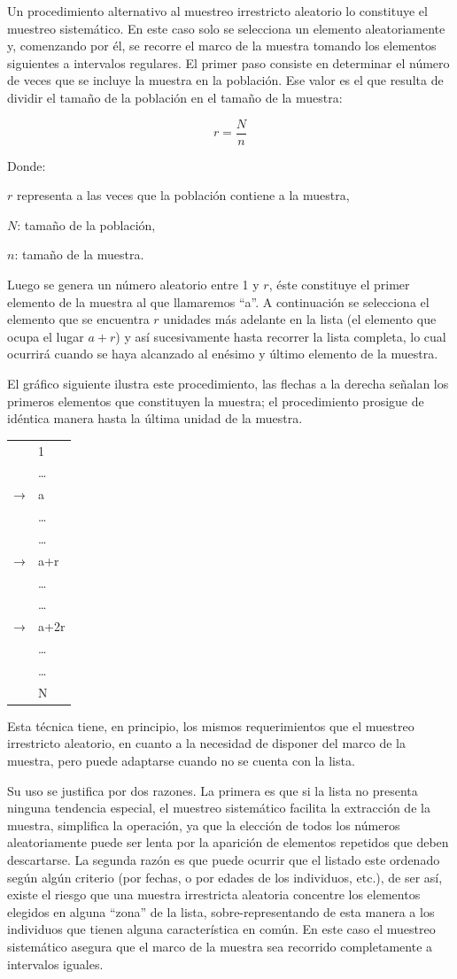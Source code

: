 \documentclass[]{book}
\begin{document}
Un procedimiento alternativo al muestreo irrestricto aleatorio lo constituye el muestreo sistemático. En este caso solo se selecciona un elemento aleatoriamente y, comenzando por él, se recorre el marco de la muestra tomando los elementos siguientes a intervalos regulares. El primer paso consiste en determinar el número de veces que se incluye la muestra en la población. Ese valor es el que resulta de dividir el tamaño de la población en el tamaño de la muestra:

\[r = \frac{N}{n}\]

Donde:

\(r\) representa a las veces que la población contiene a la muestra,

\(N\): tamaño de la población,

\(n\): tamaño de la muestra.

Luego se genera un número aleatorio entre 1 y \(r\), éste constituye el
primer elemento de la muestra al que llamaremos ``a''. A continuación se
selecciona el elemento que se encuentra \(r\) unidades más adelante en la lista (el elemento que ocupa el lugar \(a+r\)) y así sucesivamente hasta recorrer la lista completa, lo cual ocurrirá cuando se haya alcanzado al
enésimo y último elemento de la muestra.

El gráfico siguiente ilustra este procedimiento, las flechas a la
derecha señalan los primeros elementos que constituyen la muestra; el
procedimiento prosigue de idéntica manera hasta la última unidad de la
muestra.

\begin{longtable}[]{@{}ll@{}}
\toprule
\endhead
& 1\tabularnewline
& \ldots{}\tabularnewline
→ & a\tabularnewline
& \ldots{}\tabularnewline
& \ldots{}\tabularnewline
→ & a+r\tabularnewline
& \ldots{}\tabularnewline
& \ldots{}\tabularnewline
→ & a+2r\tabularnewline
& \ldots{}\tabularnewline
& \ldots{}\tabularnewline
& N\tabularnewline
\bottomrule
\end{longtable}

Esta técnica tiene, en principio, los mismos requerimientos que el
muestreo irrestricto aleatorio, en cuanto a la necesidad de disponer del
marco de la muestra, pero puede adaptarse cuando no se cuenta con la
lista.

Su uso se justifica por dos razones. La primera es que si la lista no
presenta ninguna tendencia especial, el muestreo sistemático facilita la
extracción de la muestra, simplifica la operación, ya que la elección de
todos los números aleatoriamente puede ser lenta por la aparición de
elementos repetidos que deben descartarse. La segunda razón es que puede
ocurrir que el listado este ordenado según algún criterio (por fechas, o
por edades de los individuos, etc.), de ser así, existe el riesgo que
una muestra irrestricta aleatoria concentre los elementos elegidos en
alguna ``zona'' de la lista, sobre-representando de esta manera a los
individuos que tienen alguna característica en común. En este caso el
muestreo sistemático asegura que el marco de la muestra sea recorrido
completamente a intervalos iguales.
\end{document}
